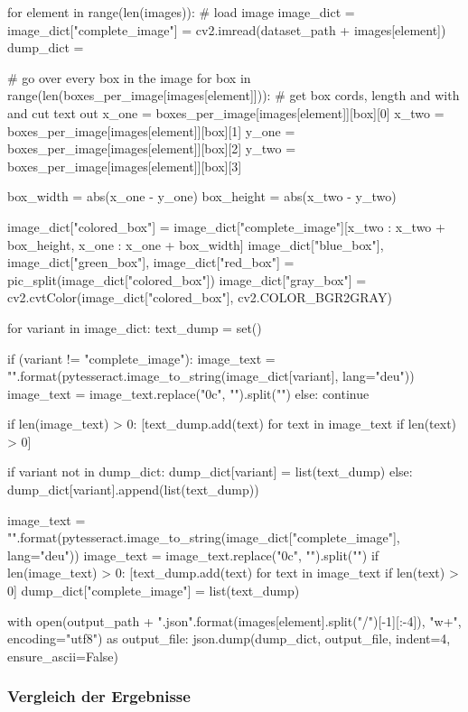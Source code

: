 \documentclass[a4paper,12pt,ngerman]{article}
\begin{document}
\begin{python}
for element in range(len(images)):
	# load image
	image_dict = {}
	image_dict["complete_image"] = cv2.imread(dataset_path + images[element])
	dump_dict = {}

	# go over every box in the image
	for box in range(len(boxes_per_image[images[element]])):
		# get box cords, length and with and cut text out
		x_one = boxes_per_image[images[element]][box][0]
		x_two = boxes_per_image[images[element]][box][1]
		y_one = boxes_per_image[images[element]][box][2]
		y_two = boxes_per_image[images[element]][box][3]

		box_width = abs(x_one - y_one)
		box_height = abs(x_two - y_two)

		image_dict["colored_box"] = image_dict["complete_image"][x_two : x_two + box_height, x_one : x_one + box_width]
		image_dict["blue_box"], image_dict["green_box"], image_dict["red_box"] = pic_split(image_dict["colored_box"])
		image_dict["gray_box"] = cv2.cvtColor(image_dict["colored_box"], cv2.COLOR_BGR2GRAY)

		for variant in image_dict:
			text_dump = set()

			if (variant != "complete_image"):
				image_text = "{}".format(pytesseract.image_to_string(image_dict[variant], lang="deu"))
				image_text = image_text.replace("\x0c", "").split("\n")
			else:
				continue

			if len(image_text) > 0:
				[text_dump.add(text) for text in image_text if len(text) > 0]
			
			if variant not in dump_dict:
				dump_dict[variant] = list(text_dump)
			else:
				dump_dict[variant].append(list(text_dump))

	image_text = "{}".format(pytesseract.image_to_string(image_dict["complete_image"], lang="deu"))
	image_text = image_text.replace("\x0c", "").split("\n")
	if len(image_text) > 0:
		[text_dump.add(text) for text in image_text if len(text) > 0]
	dump_dict["complete_image"] = list(text_dump)

	with open(output_path + "{}.json".format(images[element].split("/")[-1][:-4]), "w+", encoding="utf8") as output_file:
		json.dump(dump_dict, output_file, indent=4, ensure_ascii=False)
\end{python}

\subsubsection{Vergleich der Ergebnisse}
\end{document}
